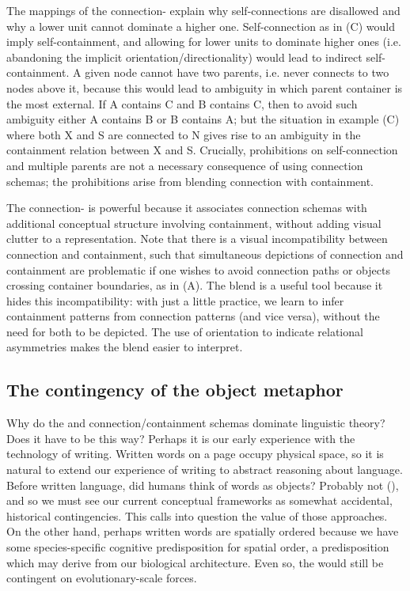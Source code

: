   The mappings of the connection- explain why self-con\-nec\-tions are disallowed and why a lower unit cannot dominate a higher one. Self-con\-nec\-tion as in (C) would imply self-containment, and allowing for lower units to dominate higher ones (i.e. abandoning the implicit orientation/directionality) would lead to indirect self-containment. A given node cannot have two parents, i.e. never connects to two nodes above it, because this would lead to ambiguity in which parent container is the most external. If A contains C and B contains C, then to avoid such ambiguity either A contains B or B contains A; but the situation in example {}(C) where both X and S are connected to N gives rise to an ambiguity in the containment relation between X and S. Crucially, prohibitions on self-connection and multiple parents are not a necessary consequence of using connection schemas; the prohibitions arise from blending connection with containment.

  The connection- is powerful because it associates connection schemas with additional conceptual structure involving containment, without adding visual clutter to a representation. Note that there is a visual incompatibility between connection and containment, such that simultaneous depictions of connection and containment are problematic if one wishes to avoid connection paths or objects crossing container boundaries, as in (A). The blend is a useful tool because it hides this incompatibility: with just a little practice, we learn to infer containment patterns from connection patterns (and vice versa), without the need for both to be depicted. The use of orientation to indicate relational asymmetries makes the blend easier to interpret.

\subsection{The contingency of the object metaphor}

Why do the  and connection/containment schemas dominate linguistic theory? Does it have to be this way? Perhaps it is our early experience with the technology of writing. Written words on a page occupy physical space, so it is natural to extend our experience of writing to abstract reasoning about language. Before written language, did humans think of words as objects? Probably not (\citealt{Linell1988,Linell2005,Ong2013}), and so we must see our current conceptual frameworks as somewhat accidental, historical contingencies. This calls into question the value of those approaches. On the other hand, perhaps written words are spatially ordered because we have some species-specific cognitive predisposition for spatial order, a predisposition which may derive from our biological architecture. Even so, the  would still be contingent on evolutionary-scale forces. 

